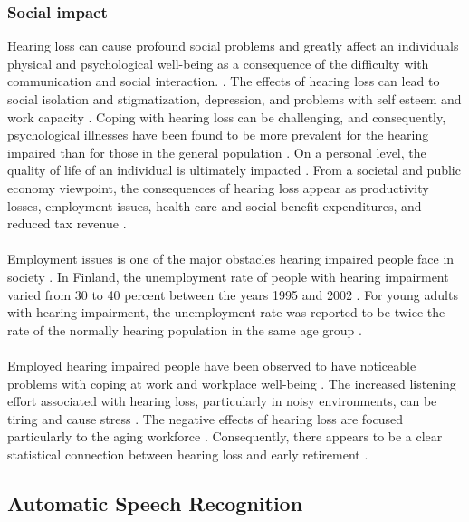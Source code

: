 \documentclass[english, 12pt, a4paper, pdftex, elec, utf8]{aaltothesis}
\begin{document}
\subsubsection{Social impact}

Hearing loss can cause profound social problems and greatly affect an individuals physical and psychological well-being as a consequence of the difficulty with communication and social interaction. \cite{wilson2017global, koskela2013kuulokojeen}. The effects of hearing loss can lead to social isolation and stigmatization, depression, and problems with self esteem and work capacity \cite{wilson2017global, koskela2013kuulokojeen, lavikainen2014}. Coping with hearing loss can be challenging, and consequently, psychological illnesses have been found to be more prevalent for the hearing impaired than for those in the general population \cite{wilson2017global}. On a personal level, the quality of life of an individual is ultimately impacted \cite{blomberg2012sisakorvaistutetta}. From a societal and public economy viewpoint, the consequences of hearing loss appear as productivity losses, employment issues, health care and social benefit expenditures, and reduced tax revenue  \cite{wilson2017global}. \\\\
Employment issues is one of the major obstacles hearing impaired people face in society \cite{hietala2008huonokuuloinen}. In Finland, the unemployment rate of people with hearing impairment varied from 30 to 40 percent between the years 1995 and 2002 \cite{hietala2008huonokuuloinen}. For young adults with hearing impairment, the unemployment rate was reported to be twice the rate of the normally hearing population in the same age group \cite{hietala2008huonokuuloinen}. \\\\
Employed hearing impaired people have been observed to have noticeable problems with coping at work and workplace well-being \cite{wilson2017global, hietala2008huonokuuloinen}. The increased listening effort associated with hearing loss, particularly in noisy environments, can be tiring and cause stress \cite{ohlenforst2017effects, koskela2013kuulokojeen}. The negative effects of hearing loss are focused particularly to the aging workforce \cite{koskela2013kuulokojeen}. Consequently, there appears to be a clear statistical connection between hearing loss and early retirement \cite{hietala2008huonokuuloinen}.

\clearpage

\subsection{Automatic Speech Recognition} \label{subsec:asr}
\end{document}
